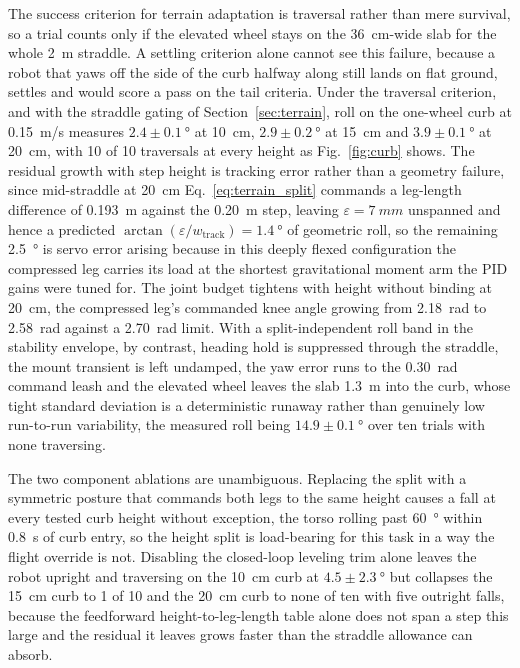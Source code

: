 \documentclass[a4paper,fleqn]{cas-dc}
\begin{document}
The success criterion for terrain adaptation is traversal rather than mere
survival, so a trial counts only if the elevated wheel stays on the
\SI{36}{cm}-wide slab for the whole \SI{2}{m} straddle. A settling criterion
alone cannot see this failure, because a robot that yaws off the side of the curb
halfway along still lands on flat ground, settles and would score a pass on the
tail criteria. Under the traversal criterion, and with the straddle gating of
Section~\ref{sec:terrain}, roll on the one-wheel curb at \SI{0.15}{m/s} measures
$2.4{\pm}\SI{0.1}{\degree}$ at \SI{10}{cm}, $2.9{\pm}\SI{0.2}{\degree}$ at
\SI{15}{cm} and $3.9{\pm}\SI{0.1}{\degree}$ at \SI{20}{cm}, with \num{10} of
\num{10} traversals at every height as Fig.~\ref{fig:curb} shows. The residual
growth with step height is tracking error rather than a geometry failure, since
mid-straddle at \SI{20}{cm} Eq.~\eqref{eq:terrain_split} commands a leg-length
difference of \SI{0.193}{m} against the \SI{0.20}{m} step, leaving
$\varepsilon{=}\SI{7}{mm}$ unspanned and hence a predicted
$\arctan(\varepsilon/w_{\text{track}}){=}\SI{1.4}{\degree}$ of geometric roll, so
the remaining \SI{2.5}{\degree} is servo error arising because in this deeply
flexed configuration the compressed leg carries its load at the shortest
gravitational moment arm the PID gains were tuned for. The joint budget tightens
with height without binding at \SI{20}{cm}, the compressed leg's commanded knee
angle growing from \SI{2.18}{rad} to \SI{2.58}{rad} against a \SI{2.70}{rad}
limit. With a split-independent roll band in the stability envelope, by contrast,
heading hold is suppressed through the straddle, the mount transient is left
undamped, the yaw error runs to the \SI{0.30}{rad} command leash and the elevated
wheel leaves the slab \SI{1.3}{m} into the curb, whose tight standard deviation
is a deterministic runaway rather than genuinely low run-to-run variability, the
measured roll being $14.9{\pm}\SI{0.1}{\degree}$ over ten trials with none
traversing.

The two component ablations are unambiguous. Replacing the split with a symmetric
posture that commands both legs to the same height causes a fall at every tested
curb height without exception, the torso rolling past \SI{60}{\degree} within
\SI{0.8}{s} of curb entry, so the height split is load-bearing for this task in a
way the flight override is not. Disabling the closed-loop leveling trim alone
leaves the robot upright and traversing on the \SI{10}{cm} curb at
$4.5{\pm}\SI{2.3}{\degree}$ but collapses the \SI{15}{cm} curb to \num{1} of
\num{10} and the \SI{20}{cm} curb to none of ten with five outright falls, because the feedforward height-to-leg-length table
alone does not span a step this large and the residual it leaves grows faster
than the straddle allowance can absorb.
\end{document}
